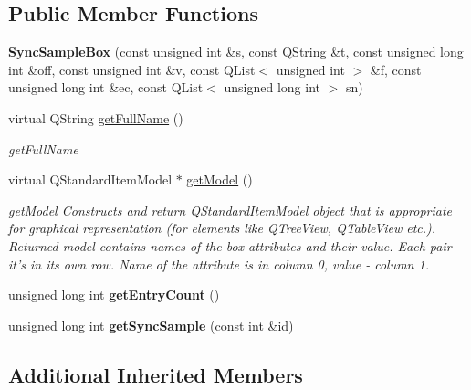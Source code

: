 \subsection*{Public Member Functions}
\begin{DoxyCompactItemize}
\item 
\hypertarget{class_sync_sample_box_a4995b1c8ee3fdd38908c05fcff8a1dcb}{{\bfseries Sync\-Sample\-Box} (const unsigned int \&s, const Q\-String \&t, const unsigned long int \&off, const unsigned int \&v, const Q\-List$<$ unsigned int $>$ \&f, const unsigned long int \&ec, const Q\-List$<$ unsigned long int $>$ sn)}\label{class_sync_sample_box_a4995b1c8ee3fdd38908c05fcff8a1dcb}

\item 
virtual Q\-String \hyperlink{class_sync_sample_box_a9d3ab6e8730ca0cca633b7920e131413}{get\-Full\-Name} ()
\begin{DoxyCompactList}\small\item\em get\-Full\-Name \end{DoxyCompactList}\item 
virtual Q\-Standard\-Item\-Model $\ast$ \hyperlink{class_sync_sample_box_afe48e1f32651b46329c3834e642b18f9}{get\-Model} ()
\begin{DoxyCompactList}\small\item\em get\-Model Constructs and return Q\-Standard\-Item\-Model object that is appropriate for graphical representation (for elements like Q\-Tree\-View, Q\-Table\-View etc.). Returned model contains names of the box attributes and their value. Each pair it's in its own row. Name of the attribute is in column 0, value -\/ column 1. \end{DoxyCompactList}\item 
\hypertarget{class_sync_sample_box_add458d076c5f1a3f48a31d5ca194fedd}{unsigned long int {\bfseries get\-Entry\-Count} ()}\label{class_sync_sample_box_add458d076c5f1a3f48a31d5ca194fedd}

\item 
\hypertarget{class_sync_sample_box_addda4d7b79045b6251033607cf91a31e}{unsigned long int {\bfseries get\-Sync\-Sample} (const int \&id)}\label{class_sync_sample_box_addda4d7b79045b6251033607cf91a31e}

\end{DoxyCompactItemize}
\subsection*{Additional Inherited Members}



